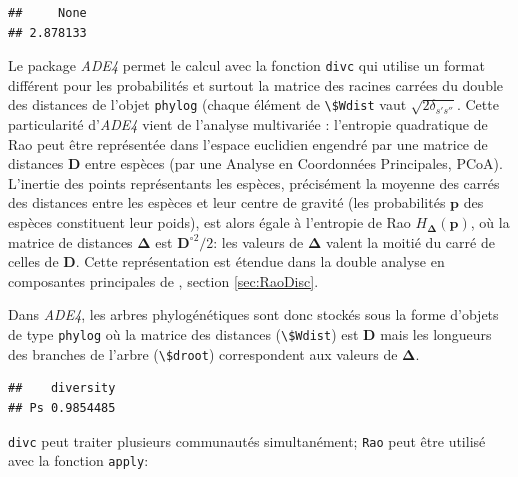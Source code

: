 \documentclass[
  11pt,
  french,
  a4paper,
  extrafontsizes,onecolumn,openright
  ]{memoir}
\newenvironment{Shaded}{\begin{snugshade}}{\end{snugshade}}
\newcommand{\KeywordTok}[1]{\textcolor[rgb]{0.13,0.29,0.53}{\textbf{#1}}}
\newcommand{\NormalTok}[1]{#1}
\newcommand{\OperatorTok}[1]{\textcolor[rgb]{0.81,0.36,0.00}{\textbf{#1}}}
\newcommand{\StringTok}[1]{\textcolor[rgb]{0.31,0.60,0.02}{#1}}
\begin{document}
\begin{verbatim}
##     None 
## 2.878133
\end{verbatim}

\normalsize

Le package \emph{ADE4} permet le calcul avec la fonction \texttt{divc} qui utilise un format différent pour les probabilités et surtout la matrice des racines carrées du double des distances de l'objet \texttt{phylog} (chaque élément de \texttt{\textbackslash{}\$Wdist} vaut \(\sqrt{2\delta_{s's''}}\).
Cette particularité d'\emph{ADE4} vient de l'analyse multivariée \autocite{Champely2002}: l'entropie quadratique de Rao peut être représentée dans l'espace euclidien engendré par une matrice de distances \(\mathbf{D}\) entre espèces (par une Analyse en Coordonnées Principales, PCoA).
L'inertie des points représentants les espèces, précisément la moyenne des carrés des distances entre les espèces et leur centre de gravité (les probabilités \(\mathbf{p}\) des espèces constituent leur poids), est alors égale à l'entropie de Rao \(H_{\mathbf{\Delta}}\left(\mathbf{p}\right)\), où la matrice de distances \(\mathbf{\Delta}\) est \({\mathbf{D}^{\circ2}}/{2}\): les valeurs de \(\mathbf{\Delta}\) valent la moitié du carré de celles de \(\mathbf{D}\).
Cette représentation est étendue dans la double analyse en composantes principales de \textcite{Pavoine2004}, section \ref{sec:RaoDisc}.

Dans \emph{ADE4}, les arbres phylogénétiques sont donc stockés sous la forme d'objets de type \texttt{phylog} où la matrice des distances (\texttt{\textbackslash{}\$Wdist}) est \(\mathbf{D}\) mais les longueurs des branches de l'arbre (\texttt{\textbackslash{}\$droot}) correspondent aux valeurs de \(\mathbf{\Delta}\).

\scriptsize

\begin{Shaded}
\end{Shaded}

\begin{verbatim}
##    diversity
## Ps 0.9854485
\end{verbatim}

\normalsize

\texttt{divc} peut traiter plusieurs communautés simultanément; \texttt{Rao} peut être utilisé avec la fonction \texttt{apply}:
\end{document}
